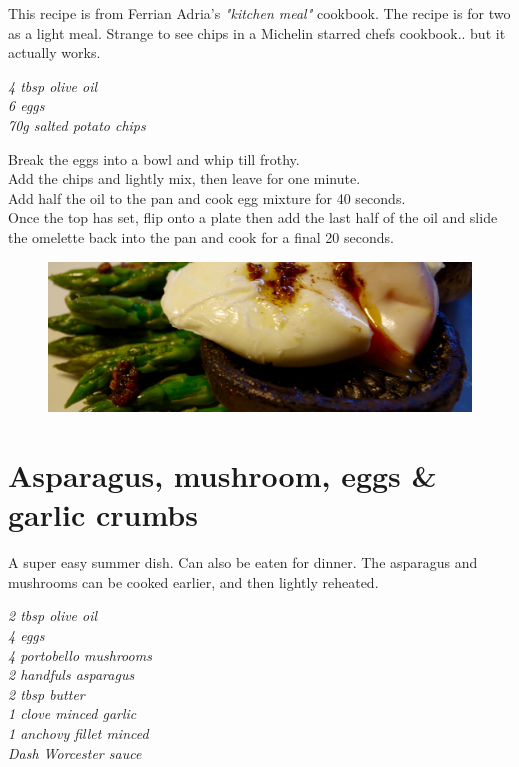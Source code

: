 \documentclass{tufte-book}
\begin{document}
This recipe is from Ferrian Adria's \emph{"kitchen meal"} cookbook. The recipe is for two as a light meal. Strange to see chips in a Michelin starred chefs cookbook.. but it actually works.

\smallskip
\emph{4 tbsp olive oil
\\6 eggs
\\70g salted potato chips
}

\smallskip
Break the eggs into a bowl and whip till frothy.
\\Add the chips and lightly mix, then leave for one minute.
\\Add half the oil to the pan and cook egg mixture for 40 seconds.
\\Once the top has set, flip onto a plate then add the last half of the oil and slide the omelette back into the pan and cook for a final 20 seconds.

\newpage

\begin{figure}[h]
  \includegraphics[width=\linewidth]{aspandeggs.png}
\end{figure}

\section{Asparagus, mushroom, eggs \& garlic crumbs}

A super easy summer dish. Can also be eaten for dinner. The asparagus and mushrooms can be cooked earlier, and then lightly reheated. 

\smallskip
\emph{2 tbsp olive oil
\\4 eggs
\\4 portobello mushrooms
\\2 handfuls asparagus
\\2 tbsp butter
\\1 clove minced garlic
\\1 anchovy fillet minced
\\Dash Worcester sauce
}
\end{document}
